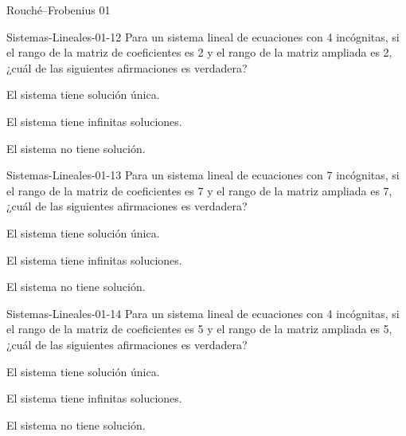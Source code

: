 \documentclass[a4,11pt]{aleph-notas}
\begin{document}
\begin{quiz}{Rouché–Frobenius 01}
\begin{multi}[]%
    {Sistemas-Lineales-01-12}
    Para un sistema lineal de ecuaciones con 4 incógnitas, si el rango de la matriz de coeficientes es 2 y el rango de la matriz ampliada es 2, ¿cuál de las siguientes afirmaciones es verdadera?
    \item El sistema tiene solución única.
    \item* El sistema tiene infinitas soluciones.
    \item El sistema no tiene solución.
\end{multi}

\begin{multi}[]%
    {Sistemas-Lineales-01-13}
    Para un sistema lineal de ecuaciones con 7 incógnitas, si el rango de la matriz de coeficientes es 7 y el rango de la matriz ampliada es 7, ¿cuál de las siguientes afirmaciones es verdadera?
    \item* El sistema tiene solución única.
    \item El sistema tiene infinitas soluciones.
    \item El sistema no tiene solución.
\end{multi}

\begin{multi}[]%
    {Sistemas-Lineales-01-14}
    Para un sistema lineal de ecuaciones con 4 incógnitas, si el rango de la matriz de coeficientes es 5 y el rango de la matriz ampliada es 5, ¿cuál de las siguientes afirmaciones es verdadera?
    \item* El sistema tiene solución única.
    \item El sistema tiene infinitas soluciones.
    \item El sistema no tiene solución.
\end{multi}


\end{quiz}
\end{document}
